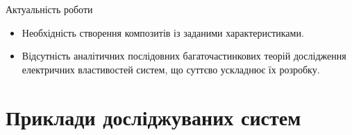 \documentclass[10pt]{beamer}
\begin{document}
\begin{frame}{Актуальність роботи}

  \begin{itemize}
    \item Необхідність створення композитів із заданими характеристиками.
    \item Відсутність аналітичних послідовних багаточастинкових теорій дослідження електричних властивостей систем, що суттєво ускладнює їх розробку.
  \end{itemize}

\end{frame}



\section{Приклади досліджуваних систем}%
\end{document}
